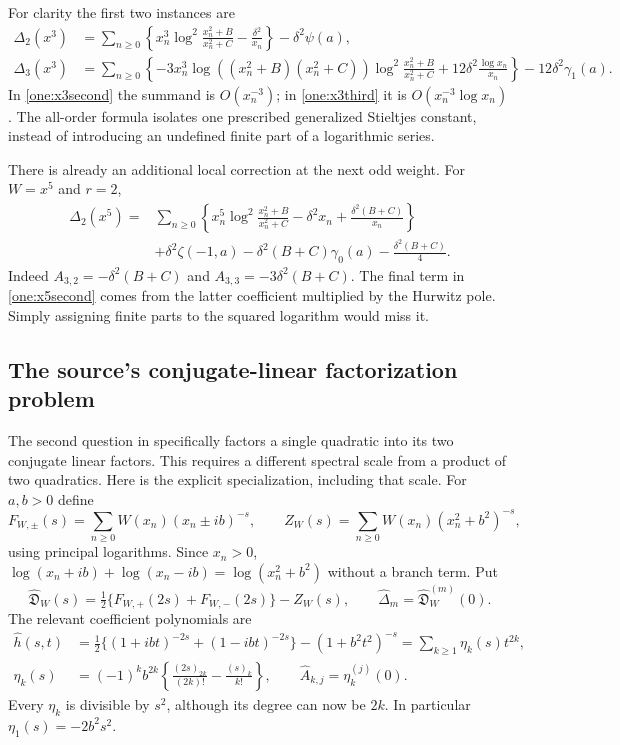 For clarity the first two instances are
\begin{align}
 \Delta_2(x^3)&=\sum_{n\ge0}\left\{
      x_n^3\log^2\frac{x_n^2+B}{x_n^2+C}-\frac{\delta^2}{x_n}\right\}
                         -\delta^2\psi(a),\label{one:x3second}\\
 \Delta_3(x^3)&=\sum_{n\ge0}\left\{
      -3x_n^3\log((x_n^2+B)(x_n^2+C))
                     \log^2\frac{x_n^2+B}{x_n^2+C}
                 +12\delta^2\frac{\log x_n}{x_n}\right\}
                         -12\delta^2\gamma_1(a).\label{one:x3third}
\end{align}
In \eqref{one:x3second} the summand is $O(x_n^{-3})$; in
\eqref{one:x3third} it is $O(x_n^{-3}\log x_n)$.
The all-order formula isolates one prescribed generalized Stieltjes
constant, instead of introducing an undefined finite part of a
logarithmic series.

There is already an additional local correction at the next odd weight.
For $W=x^5$ and $r=2$,
\begin{equation}\label{one:x5second}
 \begin{split}
 \Delta_2(x^5)={}&\sum_{n\ge0}\left\{
 x_n^5\log^2\frac{x_n^2+B}{x_n^2+C}
       -\delta^2x_n+\frac{\delta^2(B+C)}{x_n}\right\}\\
 &+\delta^2\zeta(-1,a)
       -\delta^2(B+C)\gamma_0(a)-\frac{\delta^2(B+C)}4.
 \end{split}
\end{equation}
Indeed $A_{3,2}=-\delta^2(B+C)$ and
$A_{3,3}=-3\delta^2(B+C)$.  The final term in
\eqref{one:x5second} comes from the latter coefficient multiplied
by the Hurwitz pole.  Simply assigning finite parts to the squared
logarithm would miss it.

\subsection{The source's conjugate-linear factorization problem}
\label{one:linear-section}

The second question in \cite{Quadratic} specifically factors a single
quadratic into its two conjugate linear factors.  This requires a
different spectral scale from a product of two quadratics.  Here is the
explicit specialization, including that scale.  For $a,b>0$ define
\[
 F_{W,\pm}(s)=\sum_{n\ge0}W(x_n)(x_n\pm ib)^{-s},\qquad
 Z_W(s)=\sum_{n\ge0}W(x_n)(x_n^2+b^2)^{-s},
\]
using principal logarithms.  Since $x_n>0$,
$\log(x_n+ib)+\log(x_n-ib)=\log(x_n^2+b^2)$ without a branch term.
Put
\[
 \widehat{\mathfrak D}_W(s)=\tfrac12
        \{F_{W,+}(2s)+F_{W,-}(2s)\}-Z_W(s),\qquad
 \widehat\Delta_m=\widehat{\mathfrak D}_W^{(m)}(0).
\]
The relevant coefficient polynomials are
\begin{align}
 \widehat h(s,t)
 &=\tfrac12\{(1+ibt)^{-2s}+(1-ibt)^{-2s}\}
                              -(1+b^2t^2)^{-s}
    =\sum_{k\ge1}\eta_k(s)t^{2k},\label{one:linear-h}\\
 \eta_k(s)&=(-1)^kb^{2k}
       \left\{\frac{(2s)_{2k}}{(2k)!}-\frac{(s)_k}{k!}\right\},
 \qquad \widehat A_{k,j}=\eta_k^{(j)}(0).
 \label{one:linear-eta}
\end{align}
Every $\eta_k$ is divisible by $s^2$, although its degree can now
be $2k$.  In particular $\eta_1(s)=-2b^2s^2$.

